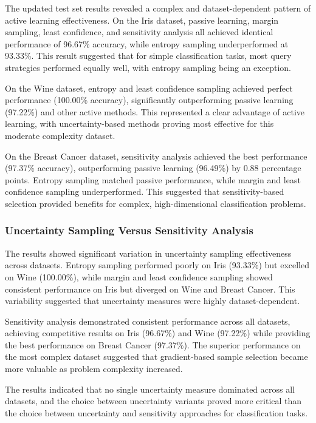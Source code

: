 \documentclass[conference]{IEEEtran}
\begin{document}
The updated test set results revealed a complex and dataset-dependent pattern of active learning effectiveness. On the Iris dataset, passive learning, margin sampling, least confidence, and sensitivity analysis all achieved identical performance of 96.67\% accuracy, while entropy sampling underperformed at 93.33\%. This result suggested that for simple classification tasks, most query strategies performed equally well, with entropy sampling being an exception.

On the Wine dataset, entropy and least confidence sampling achieved perfect performance (100.00\% accuracy), significantly outperforming passive learning (97.22\%) and other active methods. This represented a clear advantage of active learning, with uncertainty-based methods proving most effective for this moderate complexity dataset.

On the Breast Cancer dataset, sensitivity analysis achieved the best performance (97.37\% accuracy), outperforming passive learning (96.49\%) by 0.88 percentage points. Entropy sampling matched passive performance, while margin and least confidence sampling underperformed. This suggested that sensitivity-based selection provided benefits for complex, high-dimensional classification problems.

\subsubsection{Uncertainty Sampling Versus Sensitivity Analysis}

The results showed significant variation in uncertainty sampling effectiveness across datasets. Entropy sampling performed poorly on Iris (93.33\%) but excelled on Wine (100.00\%), while margin and least confidence sampling showed consistent performance on Iris but diverged on Wine and Breast Cancer. This variability suggested that uncertainty measures were highly dataset-dependent.

Sensitivity analysis demonstrated consistent performance across all datasets, achieving competitive results on Iris (96.67\%) and Wine (97.22\%) while providing the best performance on Breast Cancer (97.37\%). The superior performance on the most complex dataset suggested that gradient-based sample selection became more valuable as problem complexity increased.

The results indicated that no single uncertainty measure dominated across all datasets, and the choice between uncertainty variants proved more critical than the choice between uncertainty and sensitivity approaches for classification tasks.
\end{document}
